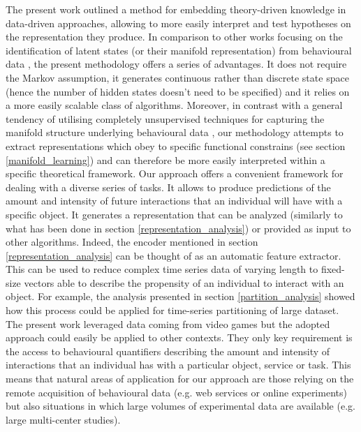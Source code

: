 The present work outlined a method for embedding theory-driven knowledge in data-driven approaches, allowing to more easily interpret and test hypotheses on the representation they produce. In comparison to other works focusing on the identification of latent states (or their manifold representation) from behavioural data \cite{calhoun2019unsupervised, luxem2020identifying, pereira2020quantifying, shi2021learning, mccullough2021unsupervised}, the present methodology offers a series of advantages. It does not require the Markov assumption, it generates continuous rather than discrete state space (hence the number of hidden states doesn't need to be specified) and it relies on a more easily scalable class of algorithms. Moreover, in contrast with a general tendency of utilising completely unsupervised techniques for capturing the manifold structure underlying behavioural data \cite{calhoun2019unsupervised, luxem2020identifying, pereira2020quantifying, shi2021learning, mccullough2021unsupervised}, our methodology attempts to extract representations which obey to specific functional constrains (see section \ref{manifold_learning}) and can therefore be more easily interpreted within a specific theoretical framework. Our approach offers a convenient framework for dealing with a diverse series of tasks. It allows to produce predictions of the amount and intensity of future interactions that an individual will have with a specific object. It generates a representation that can be analyzed (similarly to what has been done in section \ref{representation_analysis}) or provided as input to other algorithms. Indeed, the encoder mentioned in section \ref{representation_analysis} can be thought of as an automatic feature extractor. This can be used to reduce complex time series data of varying length to fixed-size vectors able to describe the propensity of an individual to interact with an object. For example, the analysis presented in section \ref{partition_analysis} showed how this process could be applied for time-series partitioning of large dataset. The present work leveraged data coming from video games but the adopted approach could easily be applied to other contexts. They only key requirement is the access to behavioural quantifiers describing the amount and intensity of interactions that an individual has with a particular object, service or task. This means that natural areas of application for our approach are those relying on the remote acquisition of behavioural data (e.g. web services or online experiments) but also situations in which large volumes of experimental data are available (e.g. large multi-center studies).  

